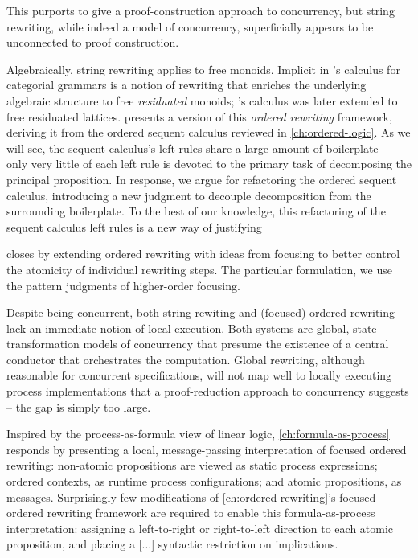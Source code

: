 This  purports to give a proof-construction approach to concurrency, but string rewriting, while indeed a model of concurrency, superficially appears to be unconnected to proof construction.




Algebraically, string rewriting applies to free monoids.
Implicit in \citeauthor{Lambek:AMM58}'s calculus for categorial grammars is a notion of rewriting that enriches the underlying algebraic structure to free \emph{residuated} monoids;
\citeauthor{Lambek:AMM58}'s calculus was later extended to free residuated lattices\autocites{Lambek:SLIM61}{Kanazawa:LLI92}.
 presents a version of this \emph{ordered rewriting} framework,
deriving it from the ordered sequent calculus reviewed in \cref{ch:ordered-logic}.
As we will see, the sequent calculus's left rules share a large amount of boilerplate -- only very little of each left rule is devoted to the primary task of decomposing the principal proposition.
In response, we argue for refactoring the ordered sequent calculus, introducing a new judgment to decouple decomposition from the surrounding boilerplate.
To the best of our knowledge, this refactoring of the sequent calculus left rules is a new way of justifying

 closes by extending ordered rewriting with ideas from focusing\autocites{Andreoli:JLC92} to better control the atomicity of individual rewriting steps.
The particular formulation, we use the pattern judgments of higher-order focusing\autocite{Zeilberger:POPL08}.


Despite being concurrent, both string rewiting and (focused) ordered rewriting lack an immediate notion of local execution.
Both systems are global, state-transformation models of concurrency that presume the existence of a central conductor that orchestrates the computation.
Global rewriting, although reasonable for concurrent specifications, will not map well to locally executing process implementations that a proof-reduction approach to concurrency suggests -- the gap is simply too large.

Inspired by the process-as-formula view of linear logic\autocites{Miller:??}{Cervesato+Scedrov:IC09}, \cref{ch:formula-as-process} responds by presenting a local, message-passing interpretation of focused ordered rewriting:
non-atomic propositions are viewed as static process expressions; ordered contexts, as runtime process configurations; and atomic propositions, as messages.
Surprisingly few modifications of \cref{ch:ordered-rewriting}'s focused ordered rewriting framework are required to enable this formula-as-process interpretation: assigning a left-to-right or right-to-left direction to each atomic proposition, and placing a [...] syntactic restriction on implications.

